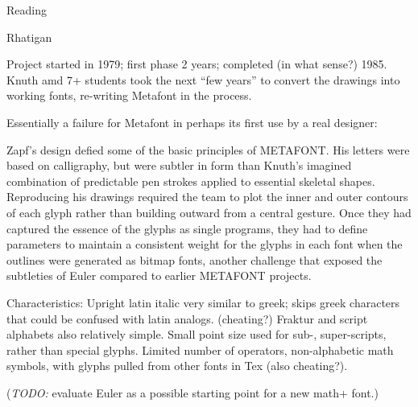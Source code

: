 \documentclass[11pt]{PalisadesLakesBook}
\begin{document}
\begin{plSection}{Reading}
\begin{plSection}{Rhatigan}
\begin{plSection}{}
\begin{plSection}{}
Project started in 1979; first phase 2 years;
completed (in what sense?) 1985.
Knuth amd 7+ students took the next ``few years''
to convert the drawings into working fonts,
re-writing Metafont in the process.

Essentially a failure for Metafont in perhaps its first use 
by a real designer:
\begin{plQuote}{{}}{}
Zapf's design defied some of the basic principles of METAFONT. 
His letters were based on calligraphy, 
but were subtler in form than Knuth's imagined combination 
of predictable pen strokes applied to essential skeletal shapes. 
Reproducing his drawings required the team 
to plot the inner and outer contours of each glyph 
rather than building outward from a central gesture. 
Once they had captured the essence of the glyphs 
as single programs, 
they had to define parameters to maintain a consistent weight 
for the glyphs in each font 
when the outlines were generated as bitmap fonts, 
another challenge that exposed the subtleties of Euler 
compared to earlier METAFONT projects.
\end{plQuote}

Characteristics:
Upright latin italic very similar to greek;
skips greek characters that could be confused with latin analogs.
(cheating?)
Fraktur and script alphabets also relatively simple.
Small point size used for sub-, super-scripts, rather than special
glyphs.
Limited number of operators, non-alphabetic math symbols,
with glyphs pulled from other fonts in Tex (also cheating?).

(\emph{TODO:} evaluate Euler as a possible starting point 
for a new math+ font.)


\end{plSection}
\end{plSection}
\end{plSection}
\end{plSection}
\end{document}
